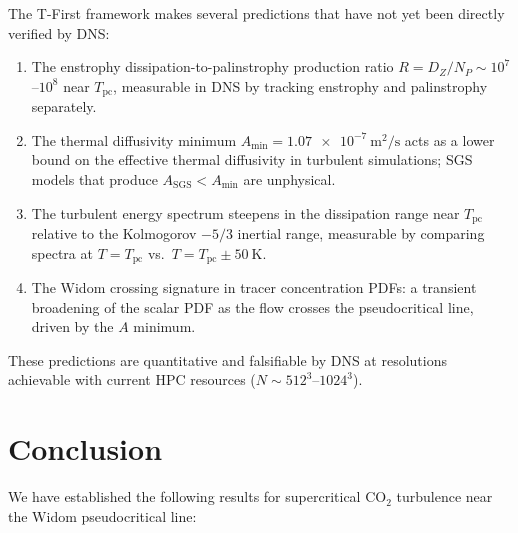\documentclass[12pt,a4paper]{article}
\newcommand{\Tc}{T_{\mathrm{pc}}}   %
\newcommand{\Amin}{A_{\min}}
\begin{document}
The T-First framework makes several predictions that have not yet been directly
verified by DNS:
\begin{enumerate}[label=(\arabic*)]
  \item The enstrophy dissipation-to-palinstrophy production ratio
    $R = D_Z/N_P \sim 10^7$--$10^8$ near $\Tc$, measurable in DNS by tracking
    enstrophy and palinstrophy separately.
  \item The thermal diffusivity minimum $\Amin = \SI{1.07e-7}{\metre\squared\per\second}$
    acts as a lower bound on the effective thermal diffusivity in turbulent simulations;
    SGS models that produce $A_{\mathrm{SGS}} < \Amin$ are unphysical.
  \item The turbulent energy spectrum steepens in the dissipation range near $\Tc$
    relative to the Kolmogorov $-5/3$ inertial range, measurable by comparing
    spectra at $T = \Tc$ vs.\ $T = \Tc \pm \SI{50}{\kelvin}$.
  \item The Widom crossing signature in tracer concentration PDFs: a transient
    broadening of the scalar PDF as the flow crosses the pseudocritical line,
    driven by the $A$ minimum.
\end{enumerate}
These predictions are quantitative and falsifiable by DNS at resolutions achievable
with current HPC resources ($N \sim 512^3$--$1024^3$).

\section{Conclusion}
\label{sec:conclusion}

We have established the following results for supercritical CO$_2$ turbulence near
the Widom pseudocritical line:
\end{document}
